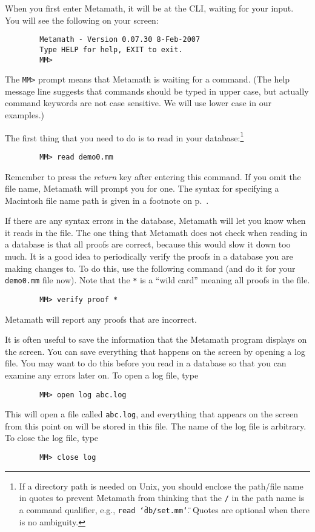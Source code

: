 When you first enter Metamath, it will be at the CLI, waiting
for your input. You will see the following on your screen:
\begin{verbatim}
        Metamath - Version 0.07.30 8-Feb-2007
        Type HELP for help, EXIT to exit.
        MM>
\end{verbatim}
The \texttt{MM>} prompt means that Metamath is waiting for a command.
(The help message line suggests that commands should be typed in upper
case, but actually command keywords are not case
sensitive.  We will use lower case in our examples.)

The first thing that you need to do is to read in your
database:\footnote{If a directory path is
needed on Unix, you should
enclose the path/file name in quotes to prevent Metamath from thinking
that the \texttt{/} in the path name is a command qualifier, e.g.,
\texttt{read \char`\"db/set.mm\char`\"}.  Quotes are optional when there
is no ambiguity.}
\begin{verbatim}
        MM> read demo0.mm
\end{verbatim}
Remember to press the {\em return} key after entering this command.  If
you omit the file name, Metamath will prompt you for one.   The syntax for
specifying a Macintosh file name path is given in a footnote on
p.~\pageref{includef}.

If there are any syntax errors in the database, Metamath will let you know
when it reads in the file.  The one thing that Metamath does not check when
reading in a database is that all proofs are correct, because this would
slow it down too much.  It is a good idea to periodically verify the proofs in
a database you are making changes to.  To do this, use the following command
(and do it for your \texttt{demo0.mm} file now).  Note that the \texttt{*} is a
``wild card'' meaning all proofs in the file.
\begin{verbatim}
        MM> verify proof *
\end{verbatim}
Metamath will report any proofs that are incorrect.

It is often useful to save the information that the Metamath program displays
on the screen. You can save everything that happens on the screen by opening a
log file. You may want to do this before you read in a database so that you
can examine any errors later on.  To open a log file, type
\begin{verbatim}
        MM> open log abc.log
\end{verbatim}
This will open a file called \texttt{abc.log}, and everything that appears on the
screen from this point on will be stored in this file.  The name of the log file
is arbitrary. To close the log file, type
\begin{verbatim}
        MM> close log
\end{verbatim}

